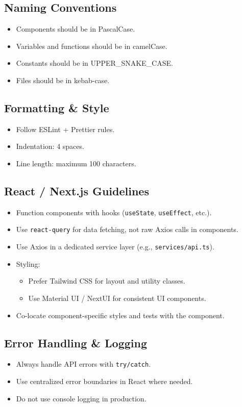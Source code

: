 \documentclass{article}
\begin{document}
\subsection*{Naming Conventions}
\begin{itemize}
  \item Components should be in PascalCase.
  \item Variables and functions should be in camelCase.
  \item Constants should be in UPPER\_SNAKE\_CASE.
  \item Files should be in kebab-case.
\end{itemize}

\subsection*{Formatting \& Style}
\begin{itemize}
  \item Follow ESLint + Prettier rules.
  \item Indentation: 4 spaces.
  \item Line length: maximum 100 characters.
\end{itemize}

\subsection*{React / Next.js Guidelines}
\begin{itemize}
  \item Function components with hooks (\texttt{useState}, \texttt{useEffect}, etc.).
  \item Use \texttt{react-query} for data fetching, not raw Axios calls in components.
  \item Use Axios in a dedicated service layer (e.g., \texttt{services/api.ts}).
  \item Styling:
    \begin{itemize}
      \item Prefer Tailwind CSS for layout and utility classes.
      \item Use Material UI / NextUI for consistent UI components.
    \end{itemize}
  \item Co-locate component-specific styles and tests with the component.
\end{itemize}

\subsection*{Error Handling \& Logging}
\begin{itemize}
  \item Always handle API errors with \texttt{try/catch}.
  \item Use centralized error boundaries in React where needed.
  \item Do not use console logging in production.
\end{itemize}
\end{document}
